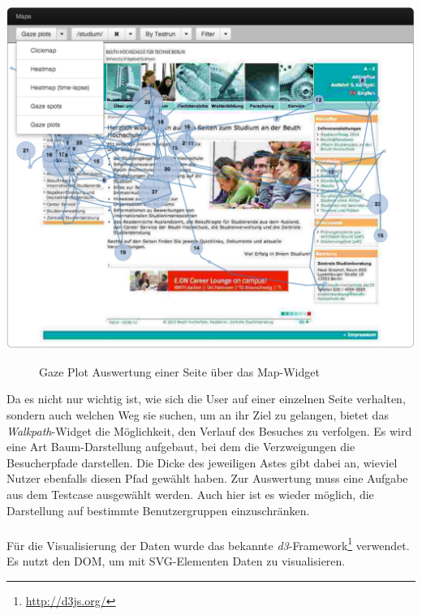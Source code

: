 \begin{center}
\includegraphics[scale=0.45]{./images/mapWidget}
\end{center}
\begin{figure}[htb]
   \centering
   \caption{Gaze Plot Auswertung einer Seite über das Map-Widget}
    \label{mapWidget}
\end{figure}

Da es nicht nur wichtig ist, wie sich die User auf einer einzelnen Seite verhalten, sondern auch welchen Weg sie suchen, um an ihr Ziel zu gelangen, bietet das \textit{Walkpath}-Widget die Möglichkeit, den Verlauf des Besuches zu verfolgen. Es wird eine Art Baum-Darstellung aufgebaut, bei dem die Verzweigungen die Besucherpfade darstellen. Die Dicke des jeweiligen Astes gibt dabei an, wieviel Nutzer ebenfalls diesen Pfad gewählt haben. Zur Auswertung muss eine Aufgabe aus dem Testcase ausgewählt werden. Auch hier ist es wieder möglich, die Darstellung auf bestimmte Benutzergruppen einzuschränken.\\
\\
Für die Visualisierung der Daten wurde das bekannte \textit{d3}-Framework\footnote{\url{http://d3js.org/}} verwendet. Es nutzt den DOM, um mit SVG-Elementen Daten zu visualisieren.

